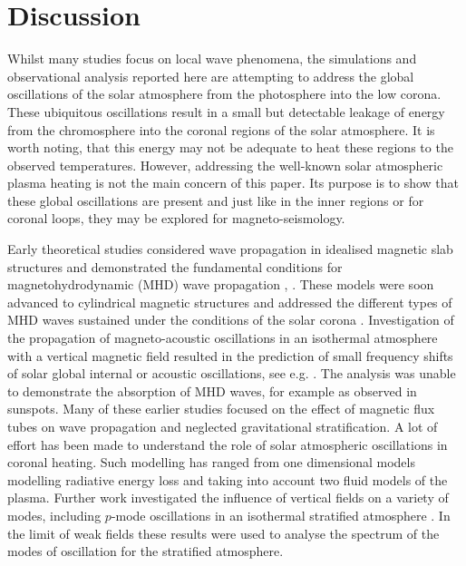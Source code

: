 \documentclass[physics,article,submit,pdftex,moreauthors]{Definitions/mdpi}
\begin{document}
\section{Discussion}
Whilst many studies focus on local wave phenomena, the simulations and observational analysis reported here are attempting to address the global oscillations of the solar atmosphere from the photosphere into the low corona. These ubiquitous oscillations result in a small but detectable leakage of energy from the chromosphere  into the coronal regions of the solar atmosphere. It is worth noting, that this energy may not be adequate to heat these regions to the observed temperatures. However, addressing the well-known  solar atmospheric plasma heating is not the main concern of this paper. Its purpose is to show that these global oscillations are present and just like in the inner regions or for coronal loops, they may be explored for magneto-seismology.

Early theoretical studies   considered wave propagation in idealised magnetic slab structures and demonstrated the fundamental conditions for  magnetohydrodynamic (MHD) wave propagation  \cite{Roberts1981a}, \cite{Roberts1981b}. These models were soon advanced to cylindrical magnetic structures and addressed 
the different types of MHD waves sustained under the conditions of the solar corona \cite{EdwinandRoberts1983}.  Investigation of the propagation of magneto-acoustic oscillations in an isothermal atmosphere with a vertical magnetic field resulted in the prediction of small frequency shifts of solar global internal or acoustic oscillations, see e.g. \cite{Hindman1996}. The analysis was unable to demonstrate the absorption of MHD waves,  for example as observed in sunspots. Many of these  earlier studies  focused on the effect of magnetic flux tubes on wave propagation and neglected gravitational stratification. A lot of effort has been made to understand the role of solar atmospheric oscillations in coronal heating. Such modelling has ranged from one dimensional models modelling radiative energy loss  and taking into account two fluid models of the plasma. Further work investigated the influence of vertical fields on a variety of modes, including $p$-mode oscillations in an isothermal stratified atmosphere  \cite{Hasan1992}. In the limit of weak fields these results were used to analyse the spectrum of the modes of oscillation for the stratified atmosphere.
\end{document}

